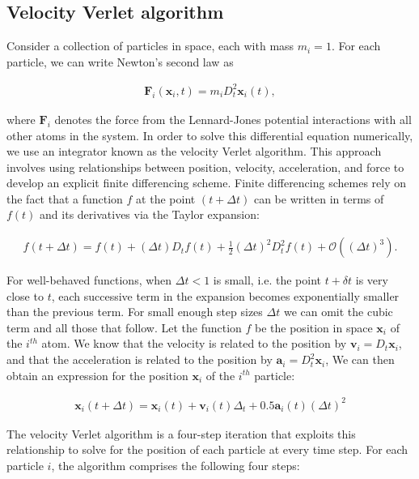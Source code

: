 \documentclass[10pt,a4paper]{article}
\begin{document}
\subsection{Velocity Verlet algorithm}
Consider a collection of particles in space, each with mass $m_i=1$. For each particle, we can write Newton's second law as

\begin{align}
\mathbf{F}_i(\mathbf{x}_i,t)=m_iD_t^2\mathbf{x}_i(t),
\end{align}

where $\mathbf{F}_i$ denotes the force from the Lennard-Jones potential interactions with all other atoms in the system. In order to solve this differential equation numerically, we use an integrator known as the velocity Verlet algorithm. This approach involves using relationships between position, velocity, acceleration, and force to develop an explicit finite differencing scheme. Finite differencing schemes rely on the fact that a function $f$ at the point $(t+\Delta t)$ can be written in terms of $f(t)$ and its derivatives via the Taylor expansion:

\begin{align}
f(t+\Delta t) = f(t) + (\Delta t) D_t f(t) + \frac{1}{2}(\Delta t)^2 D_t^2 f(t) + \mathcal{O}((\Delta t)^3).
\end{align}

For well-behaved functions, when $\Delta t < 1$ is small, i.e. the point $t+\delta t$ is very close to $t$, each successive term in the expansion becomes exponentially smaller than the previous term. For small enough step sizes $\Delta t$ we can omit the cubic term and all those that follow. Let the function $f$ be the position in space $\mathbf{x}_i$ of the $i^{th}$ atom. We know that the velocity is related to the position by $\mathbf{v}_i=D_t \mathbf{x}_i$, and that the acceleration is related to the position by $\mathbf{a}_i=D_t^2\mathbf{x}_i$, We can then obtain an expression for the position $\mathbf{x}_i$ of the $i^{th}$ particle:

\begin{align}
 \mathbf{x}_i(t+\Delta t) = \mathbf{x}_i(t) + \mathbf{v}_i(t)\Delta_t + 0.5\mathbf{a}_i(t)(\Delta t)^2
\end{align}

The velocity Verlet algorithm is a four-step iteration that exploits this relationship to solve for the position of each particle at every time step. For each particle $i$, the algorithm comprises the following four steps:
\end{document}
